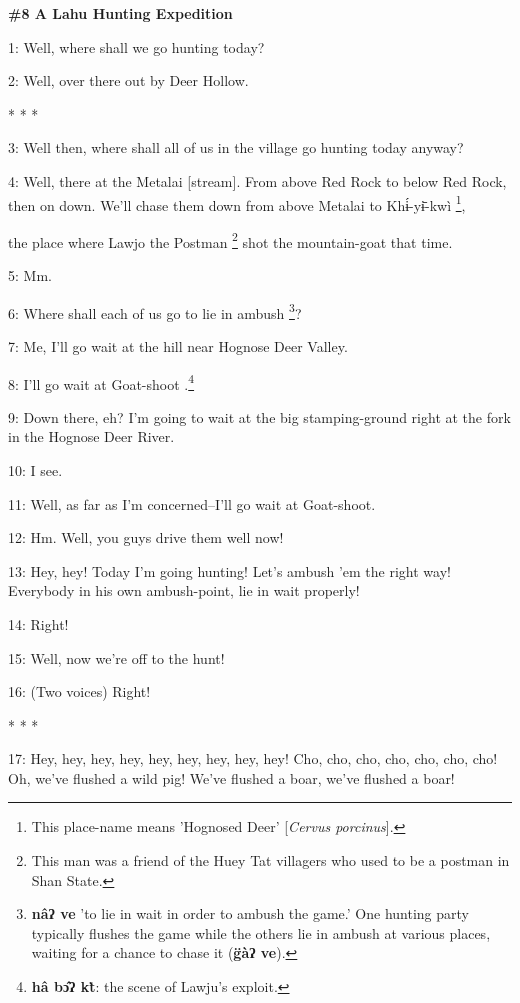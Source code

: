 
\textbf{\#8 A Lahu Hunting Expedition}

1: Well, where shall we go hunting today?

2: Well, over there out by Deer Hollow.

\begin{center}
* * *
\end{center}

\leftskip=0pt
3: Well then, where shall all of us in the village go hunting today anyway?

4: Well, there at the Metalai [stream]. From above Red Rock to below Red Rock,
then on down. We'll chase them down from above Metalai to Khɨ́-yɨ̄-kwì \footnote{This place-name means 'Hognosed Deer' [\textit{Cervus porcinus}].},

the place where Lawjo the Postman \footnote{This man was a friend of the Huey Tat villagers who used to be a postman in Shan State.} shot the mountain-goat that time.

5: Mm.

6: Where shall each of us go to lie in ambush \footnote{\textbf{nâʔ ve}  'to lie in wait in order to ambush the game.' One hunting party typically flushes the game while the others lie in ambush at various places, waiting for a chance to chase it (\textbf{g̈àʔ ve}).}?

7: Me, I'll go wait at the hill near Hognose Deer Valley.

8: I'll go wait at Goat-shoot .\footnote{\textbf{hâ bɔ̂ʔ kt̀}: the scene of Lawju's exploit.}

9: Down there, eh? I'm going to wait at the big stamping-ground right at the fork
in the Hognose Deer River.

10: I see.

11: Well, as far as I'm concerned--I'll go wait at Goat-shoot.

12: Hm. Well, you guys drive them well now!

13: Hey, hey! Today I'm going hunting! Let's ambush 'em the right way! Everybody
in his own ambush-point, lie in wait properly!

14: Right!

15: Well, now we're off to the hunt!

16: (Two voices) Right!

\begin{center}
* * *
\end{center}

\leftskip=0pt
17: Hey, hey, hey, hey, hey, hey, hey, hey, hey!  Cho, cho, cho, cho, cho, cho,
cho! Oh, we've flushed a wild pig! We've flushed a boar, we've flushed a boar!

